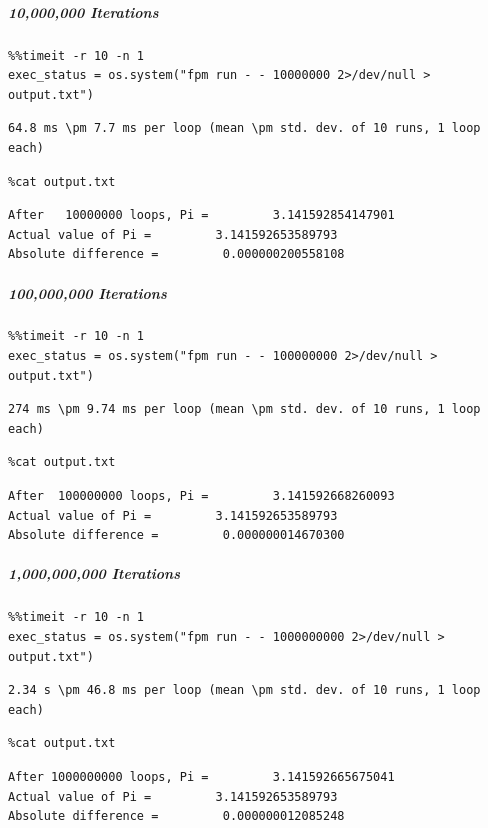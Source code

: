 \subparagraph{10,000,000 Iterations}

\begin{verbatim}
%%timeit -r 10 -n 1
exec_status = os.system("fpm run - - 10000000 2>/dev/null > output.txt")
\end{verbatim}

\begin{verbatim}
64.8 ms \pm 7.7 ms per loop (mean \pm std. dev. of 10 runs, 1 loop each)
\end{verbatim}

\begin{verbatim}
%cat output.txt
\end{verbatim}

\begin{verbatim}
After   10000000 loops, Pi =         3.141592854147901
Actual value of Pi =         3.141592653589793
Absolute difference =         0.000000200558108
\end{verbatim}

\subparagraph{100,000,000 Iterations}

\begin{verbatim}
%%timeit -r 10 -n 1
exec_status = os.system("fpm run - - 100000000 2>/dev/null > output.txt")
\end{verbatim}

\begin{verbatim}
274 ms \pm 9.74 ms per loop (mean \pm std. dev. of 10 runs, 1 loop each)
\end{verbatim}

\begin{verbatim}
%cat output.txt
\end{verbatim}

\begin{verbatim}
After  100000000 loops, Pi =         3.141592668260093
Actual value of Pi =         3.141592653589793
Absolute difference =         0.000000014670300
\end{verbatim}

\subparagraph{1,000,000,000 Iterations}

\begin{verbatim}
%%timeit -r 10 -n 1
exec_status = os.system("fpm run - - 1000000000 2>/dev/null > output.txt")
\end{verbatim}

\begin{verbatim}
2.34 s \pm 46.8 ms per loop (mean \pm std. dev. of 10 runs, 1 loop each)
\end{verbatim}

\begin{verbatim}
%cat output.txt
\end{verbatim}

\begin{verbatim}
After 1000000000 loops, Pi =         3.141592665675041
Actual value of Pi =         3.141592653589793
Absolute difference =         0.000000012085248
\end{verbatim}